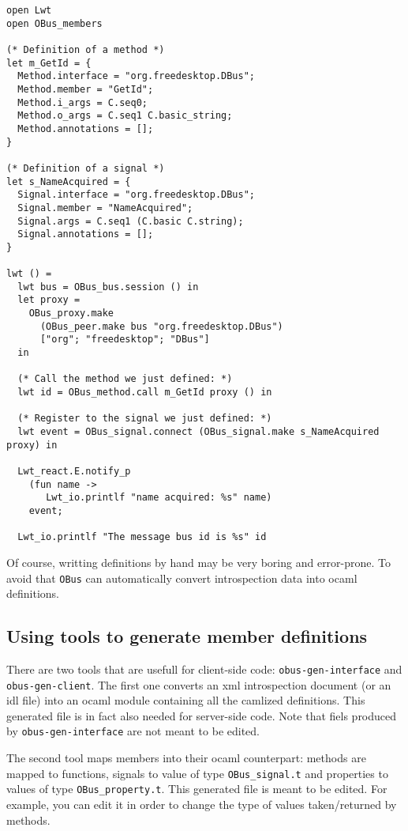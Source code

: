 \documentclass{article}
\newcommand{\obus}{\texttt{OBus}\xspace}
\begin{document}
\lstset{language=[Objective]Caml}
\begin{lstlisting}
open Lwt
open OBus_members

(* Definition of a method *)
let m_GetId = {
  Method.interface = "org.freedesktop.DBus";
  Method.member = "GetId";
  Method.i_args = C.seq0;
  Method.o_args = C.seq1 C.basic_string;
  Method.annotations = [];
}

(* Definition of a signal *)
let s_NameAcquired = {
  Signal.interface = "org.freedesktop.DBus";
  Signal.member = "NameAcquired";
  Signal.args = C.seq1 (C.basic C.string);
  Signal.annotations = [];
}

lwt () =
  lwt bus = OBus_bus.session () in
  let proxy =
    OBus_proxy.make
      (OBus_peer.make bus "org.freedesktop.DBus")
      ["org"; "freedesktop"; "DBus"]
  in

  (* Call the method we just defined: *)
  lwt id = OBus_method.call m_GetId proxy () in

  (* Register to the signal we just defined: *)
  lwt event = OBus_signal.connect (OBus_signal.make s_NameAcquired proxy) in

  Lwt_react.E.notify_p
    (fun name ->
       Lwt_io.printlf "name acquired: %s" name)
    event;

  Lwt_io.printlf "The message bus id is %s" id
\end{lstlisting}

Of course, writting definitions by hand may be very boring and
error-prone. To avoid that \obus can automatically convert
introspection data into ocaml definitions.

\subsection{Using tools to generate member definitions}

There are two tools that are usefull for client-side code:
\texttt{obus-gen-interface} and \texttt{obus-gen-client}. The first
one converts an xml introspection document (or an idl file) into an
ocaml module containing all the camlized definitions. This generated
file is in fact also needed for server-side code. Note that fiels
produced by \texttt{obus-gen-interface} are not meant to be edited.

The second tool maps members into their ocaml counterpart: methods are
mapped to functions, signals to value of type \texttt{OBus\_signal.t}
and properties to values of type \texttt{OBus\_property.t}.  This
generated file is meant to be edited. For example, you can edit it in
order to change the type of values taken/returned by methods.
\end{document}
